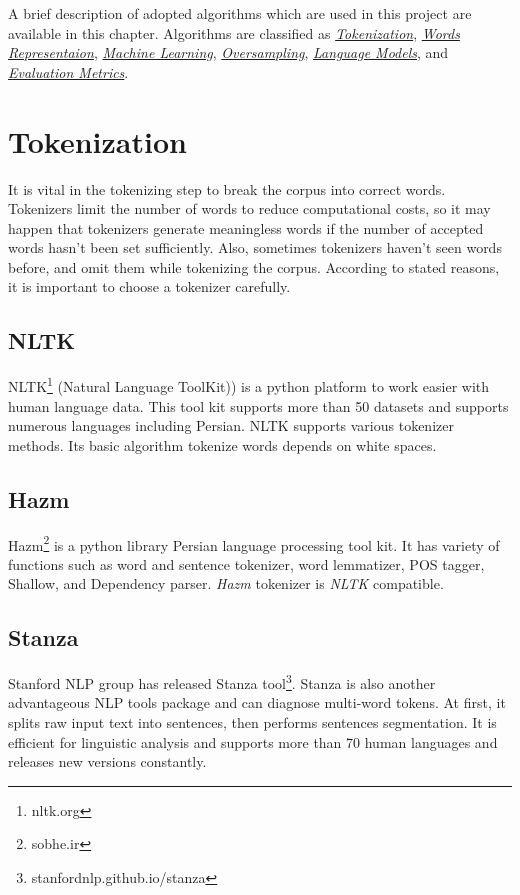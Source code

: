 A brief description of adopted algorithms which are used in this project are available in this chapter. Algorithms are classified as \textit{\hyperref[lr:tokenization]{Tokenization}}, \textit{\hyperref[lr:wordrep]{Words Representaion}}, 
\textit{\hyperref[lr:ml]{Machine Learning}},  
\textit{\hyperref[lr:oversampling]{Oversampling}},  
\textit{\hyperref[lr:lm]{Language Models}}, and  
\textit{\hyperref[lr:evalmetrics]{Evaluation Metrics}}. 
\section{Tokenization}
\label{lr:tokenization}
It is vital in the tokenizing step to break the corpus into correct words. Tokenizers limit the number of words to reduce computational costs, so it may happen that tokenizers generate meaningless words if the number of accepted words hasn't been set sufficiently. Also, sometimes tokenizers haven't seen words before, and omit them while tokenizing the corpus. According to stated reasons, it is important to choose a tokenizer carefully.

\subsection{NLTK}
NLTK\footnote{nltk.org} (Natural Language ToolKit)) is a python platform to work easier with human language data. This tool kit supports more than 50 datasets and supports numerous languages including Persian. NLTK supports various tokenizer methods. Its basic algorithm tokenize words depends on white spaces.

\subsection{Hazm}
Hazm\footnote{\label{fn:hazm}sobhe.ir} is a python library Persian language processing tool kit. It has variety of functions such as word and sentence tokenizer, word lemmatizer, POS tagger, Shallow, and Dependency parser. \textit{Hazm} tokenizer is \textit{NLTK} compatible.
		
\subsection{Stanza}
Stanford NLP group has released Stanza tool\footnote{stanfordnlp.github.io/stanza}. Stanza is also another advantageous NLP tools package and can diagnose multi-word tokens. At first, it splits raw input text into sentences, then performs sentences segmentation. It is efficient for linguistic analysis and supports more than 70 human languages and releases new versions constantly.
	
